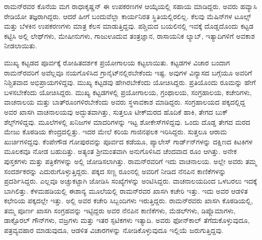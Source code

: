 ರಾಮನ್‍ರವರ ಕೊನೆಯ ಮಗ ರಾಧಾಕೃಷ್ಣನ್ ಈ ಉಪಕರಣಗಳ ಆಯ್ಕೆಯಲ್ಲಿ ಸಹಾಯ ಮಾಡಿದ್ದರು. ಅವರು ಹವ್ಯಾಸಿ ರೇಡಿಯೋ ತಜ್ಞರಾಗಿದ್ದರು. ಆದರೆ ಹೀಗೆ ಬಂದುವೆಲ್ಲಾ ಕಾರ್ಯನಿರತ ಸ್ಥಿತಿಯಲ್ಲಿರಲಿಲ್ಲ. ಕೆಲವು ಮೆಷಿನ್‍ಗಳ ಟೂಲ್ಸ್ ಮತ್ತು ಬೆಳಕಿನ ಉಪಕರಣಗಳು ಮಾತ್ರ ಕೆಲಸ ಮಾಡುತ್ತಿದ್ದವು. ಪಶ್ಚಿಮದ ಬಯಲಿನಲ್ಲಿ ಇವಕ್ಕೆ ದೊಡ್ಡದೊಂದು ಕಟ್ಟಡ ಕಟ್ಟಿಸಿ ಅಲ್ಲಿ ಲೇಥ್‍ಗಳು, ಮೇಷೀನುಗಳು, ಗಾಜುಊದುವ ತಂತ್ರಜ್ಞಾನ, ರಾಸಾಯನಿಕ ಲ್ಯಾಬ್, ಇತ್ಯಾದಿಗಳಿಗೆ ಅವಕಾಶ ನೀಡಲಾಯಿತು.

ಮುಖ್ಯ ಕಟ್ಟಡದ ಪೂರ್ವಕ್ಕೆ ರೋಹಿತದರ್ಶಕ ಪ್ರಯೋಗಾಲಯ ಕಟ್ಟಲಾಯಿತು. ಕಟ್ಟಡಗಳ ವಿಚಾರ ಬಂದಾಗ ರಾಮನ್‍ರವರಿಗೆ ಅವೆಲ್ಲವೂ ನಯಗೊಳಿಸಿದ ಗ್ರಾನೈಟ್‍ನಲ್ಲಿರಬೇಕೆಂದು ಇಷ್ಟ. ಅವುಗಳ ವಿನ್ಯಾಸದ ಬಗ್ಗೆಯೂ ಅವರಿಗೆ ನಿಶ್ಚಿತವಾದ ಅಭಿಪ್ರಾಯಗಳಿದ್ದವು. ಮುಖ್ಯ ಕಟ್ಟಡವು ಹೇಗಿರಬೇಕೆಂದು ಯೋಚಿಸಿದ್ದರು. ಪ್ರತಿಯೊಂದು ರೂಮನ್ನು ಹೇಗೆ ಬಳಸಬೇಕೆಂದು ಯೋಚಿಸಿದ್ದರು. ಮುಖ್ಯ ಕಟ್ಟಡಗಳಲ್ಲಿ ಪ್ರಯೋಗಾಲಯ, ಗ್ರಂಥಾಲಯ, ಸಂಗ್ರಹಾಲಯ, ಕಚೇರಿಗಳು, ವಾಚನಾಲಯ ಮತ್ತು ಬಾತ್‍ರೂಂಗಳಿರಬೇಕೆಂದು ಅವರು ಸ್ಥಳಾವಕಾಶ ಮಾಡಿದ್ದರು. ಸಂಗ್ರಹಾಲಯದ ಪಕ್ಕದಲ್ಲಿದ್ದ ಅವರ ಖಾಸಗಿ ವಾಚನಾಲಯವು ಅದ್ಭುತವಾಗಿತ್ತು, ಸುತ್ತಲೂ ಟೀಕ್\-‍ಮರದ ಹೊದಿಕೆ ಹಾಕಿ, ತೇಗದ ಬುಕ್ ಶೆಲ್ಫ್‌ಗಳಿದ್ದವು. ಮೂಲೆಗಳಲ್ಲಿ ಖನಿಜಗಳ ಮಾದರಿಗಳನ್ನು ಇಟ್ಟ ಶೋಕೇಸ್‍ಗಳಿದ್ದವು. ಒಂದು ದೊಡ್ಡ ತೇಗದ ಮರದ ಮೇಜು ಕೊಠಡಿಯ ಕೇಂದ್ರದಲ್ಲಿತ್ತು. ಇದರ ಮೇಲೆ ಕರಿಯ ಗಾಜಿನಫಲಕ ಇರಿಸಿದ್ದರು. ಸುತ್ತಲೂ ಆರಾಮ ಖುರ್ಚಿಗಳಿದ್ದವು. ಕೆಂಪೇಗೌಡ ಗೋಪುರವನ್ನು ಪೂರ್ವದ ಕಡೆಯೂ, ಪ್ಯಾಲೇಸ್ ಗಾರ್ಡ್‌ನ್‍ಗಳನ್ನು ದಕ್ಷಿಣದ ಕಿಟಕಿಗಳ ಮೂಲಕವೂ ನೋಡ ಬಹುದಿತ್ತು. ಅತ್ಯಂತ ಶ‍್ರೀಮಂತವಾಗಿ ಅನುಗೊಳಿಸಿದ ಚೆಂದವಾದ ರೂಂ ಆಗಿತ್ತು. ಅನೇಕ ಪುಸ್ತಕಗಳು ಮತ್ತು ಪತ್ರಿಕೆಗಳನ್ನು ಅಲ್ಲಿ ಜೋಡಿಸಲಾಗಿತ್ತು. ರಾಮನ್‍ರವರಿಗೆ ಇದು ವಾಚನಾಲಯ. ಅಲ್ಲೇ ಅವರು ತಮ್ಮ ಸಂದರ್ಶಕರನ್ನು ಎದುರುಗೊಳ್ಳುತ್ತಿದ್ದರು. ಪಕ್ಕದ ಸಣ್ಣ ರೂಂನಲ್ಲಿ ಅವರಿಗೆ ನೀಡಿದ ನೆನಪಿನ ಕಾಣಿಕೆಗಳನ್ನು ಪ್ರದರ್ಶಿಸಿದ್ದರು. ಎಲ್ಲವೂ ಅಚ್ಚುಕಟ್ಟಾಗಿ ಜೋಡಿಸಿ ಸಂಖ್ಯೆಗಳನ್ನು ಅಂಟಿಸಿದ್ದರು. ವಾಚನಾಲಯದಿಂದ ಒಳಬರಲು ಇದಕ್ಕೆ ಬಾಗಿಲಿತ್ತು. ಕೆಳಮಹಡಿಯಲ್ಲಿ ಈಶಾನ್ಯ ಮೂಲೆಯಲ್ಲಿ ರಾಮನ್‍ರವರ ಖಾಸಗಿ ಕಚೇರಿ ಇತ್ತು. ಇದು ಅವರ ಆಡಳಿತ ಕಛೇರಿಯ ಪಕ್ಕದಲ್ಲೇ ಇತ್ತು. ಅಲ್ಲಿ ಅವರ ಕಚೇರಿ ಸಿಬ್ಬಂದಿಗಳು ಇರುತ್ತಿದ್ದರು. ರಾಮನ್‍ರವರು ಖಾಸಗಿ ಕೊಠಡಿಯಲ್ಲಿ, ತಮ್ಮ ಪೂರ್ಣ ಖಾಸಗಿ ಸಂಗ್ರಹವನ್ನು ಇಟ್ಟಿದ್ದರು \enginline{-} ಅವರ ನೆನಪಿನ ಕಾಣಿಕೆಗಳು, ಮೆಡಲ್‍ಗಳು, ಡಿಪ್ಲೊಮಾಗಳು, ಡಾಕ್ಟೊರಲ್ ಗೌನ್‍ಗಳು, ವಜ್ರಗಳು ಮತ್ತು ಇತರ ಸ್ಫಟಿಕಗಳು ಇತ್ಯಾದಿ. ಅವರು ಫೋನ್‍ಕಾಲ್ ತೆಗೆದುಕೊಳ್ಳುವುದೂ, ಪತ್ರವ್ಯವಹಾರ ಮಾಡುವುದೂ, ಆಡಳಿತ ವಿಚಾರಗಳನ್ನು ನೋಡಿಕೊಳ್ಳುವುದೂ ಇಲ್ಲಿಯೆ ಜರುಗುತ್ತಿದ್ದವು.

